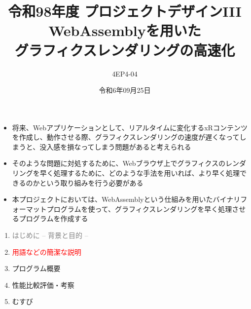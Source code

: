 % 
%

\title{
{\normalsize 令和98年度 プロジェクトデザインIII}\\\vspace{10mm}
{\LARGE WebAssemblyを用いた\\グラフィクスレンダリングの高速化}
}
\date{令和6年09月25日}
\author{
4EP4-04\\ 
}




\maketitle %
\addtocounter{page}{1}
\thispagestyle{myfirstpage}

\begin{itemize}
 \item 将来、Webアプリケーションとして、リアルタイムに変化するxRコンテンツを作成し、動作させる際、グラフィクスレンダリングの速度が遅くなってしまうと、没入感を損なってしまう問題があると考えられる
 \item そのような問題に対処するために、Webブラウザ上でグラフィクスのレンダリングを早く処理するために、どのような手法を用いれば、より早く処理できるのかという取り組みを行う必要がある
 \item 本プロジェクトにおいては、WebAssemblyという仕組みを用いたバイナリフォーマットプログラムを使って、グラフィクスレンダリングを早く処理させるプログラムを作成する
\end{itemize}
\newpage

\begin{enumerate}[itemsep=0.25\zh]
	\item \textcolor{gray}{はじめに -- 背景と目的 --}
	\item \textcolor{red}{用語などの簡潔な説明}
	\item プログラム概要
	\item 性能比較評価・考察
	\item むすび
\end{enumerate}
\newpage

